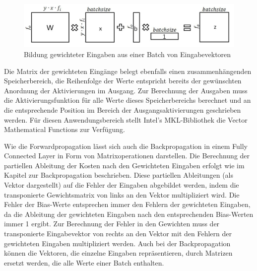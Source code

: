 \documentclass[../main.tex]{subfiles}
\begin{document}
\begin{figure}
	\centering 
	\includegraphics[width=\textwidth]{../images/Schmidt/multiinput_weighting.jpg} 
	\caption {Bildung gewichteter Eingaben aus einer Batch von Eingabevektoren}
	\label{pic:multiinput_weighting} 
\end{figure} 
Die Matrix der gewichteten Eingänge belegt ebenfalls einen zusammenhängenden Speicherbereich, die Reihenfolge der Werte entspricht bereits der gewünschten Anordnung der Aktivierungen im Ausgang. Zur Berechnung der Ausgaben muss die Aktivierungsfunktion für alle Werte dieses Speicherbereichs berechnet und an die entsprechende Position im Bereich der Ausgangsaktivierungen geschrieben werden. Für diesen Anwendungsbereich stellt Intel's MKL-Bibliothek die Vector Mathematical Functions zur Verfügung. 

Wie die Forwardpropagation lässt sich auch die Backpropagation in einem Fully Connected Layer in Form von Matrixoperationen darstellen. Die Berechnung der partiellen Ableitung der Kosten nach den Gewichteten Eingaben erfolgt wie im Kapitel zur Backpropagation beschrieben. Diese partiellen Ableitungen (als Vektor dargestellt) auf die Fehler der Eingaben abgebildet werden, indem die transponierte Gewichtsmatrix von links an den Vektor multipliziert wird. Die Fehler der Bias-Werte entsprechen immer den Fehlern der gewichteten Eingaben, da die Ableitung der gewichteten Eingaben nach den entsprechenden Bias-Werten immer 1 ergibt. Zur Berechnung der Fehler in den Gewichten muss der transponierte Eingabevektor von rechts an den Vektor mit den Fehlern der gewichteten Eingaben multipliziert werden. Auch bei der Backpropagation können die Vektoren, die einzelne Eingaben repräsentieren, durch Matrizen ersetzt werden, die alle Werte einer Batch enthalten. 
\end{document}
